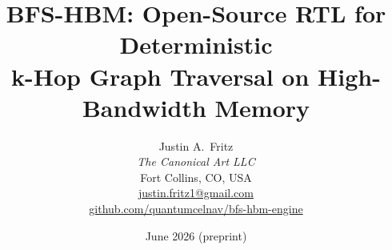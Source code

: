 \documentclass[10pt,twocolumn]{article}
\title{\textbf{BFS-HBM: Open-Source RTL for Deterministic\\
       k-Hop Graph Traversal on High-Bandwidth Memory}}
\author{
  Justin A.\ Fritz \\
  \textit{The Canonical Art LLC} \\
  Fort Collins, CO, USA \\
  \href{mailto:justin.fritz1@gmail.com}{justin.fritz1@gmail.com} \\[2pt]
  \href{https://github.com/quantumcelnav/bfs-hbm-engine}%
       {github.com/quantumcelnav/bfs-hbm-engine}
}
\date{June 2026 \quad (preprint)}
\begin{document}
\maketitle

\begin{abstract}

\end{abstract}












\end{document}
